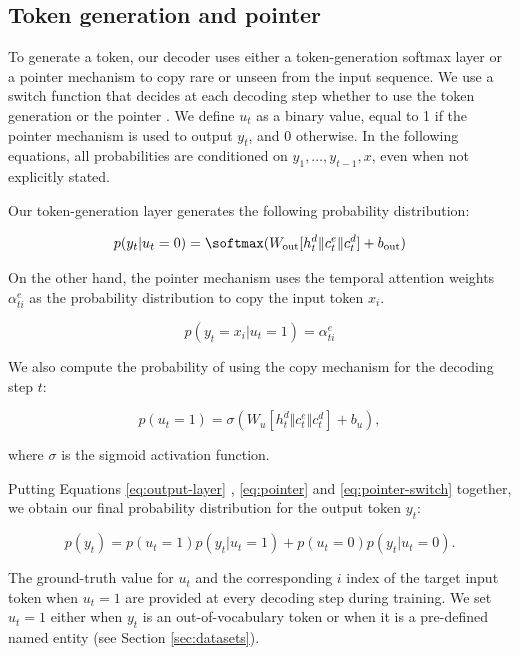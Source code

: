 \subsection{Token generation and pointer}
\label{ssec:output-layer}

To generate a token, our decoder uses either a token-generation softmax layer or a pointer mechanism to copy rare or unseen from the input sequence. We use a switch function that decides at each decoding step whether to use the token generation or the pointer \citep{gulcehre2016,nallapati2016}. We define $u_t$ as a binary value, equal to 1 if the pointer mechanism is used to output $y_t$, and 0 otherwise. In the following equations, all probabilities are conditioned on $y_1, \ldots, y_{t-1}, x$, even when not explicitly stated.

Our token-generation layer generates the following probability distribution:

\begin{equation}
p(y_t | u_t = 0) = \softmax(W_\textrm{out} [h^{d}_t \Vert c^e_t \Vert c^d_t] + b_\textrm{out})
\label{eq:output-layer}
\end{equation}

On the other hand, the pointer mechanism uses the temporal attention weights $\alpha^e_{ti}$ as the probability distribution to copy the input token $x_i$.

\begin{equation}
p(y_t = x_i |  u_t = 1 ) = \alpha^e_{ti}
\label{eq:pointer}
\end{equation}

We also compute the probability of using the copy mechanism for the decoding step $t$:

\begin{equation}
p(u_t = 1) = \sigma(W_{u} [h^{d}_t \Vert c^e_t \Vert c^d_t] + b_u),
\label{eq:pointer-switch}
\end{equation}

where $\sigma$ is the sigmoid activation function.

Putting Equations \ref{eq:output-layer} , \ref{eq:pointer} and \ref{eq:pointer-switch} together, we obtain our final probability distribution for the output token $y_t$:

\begin{equation}
p(y_t) = p(u_t = 1) p(y_t | u_t = 1) + p(u_t = 0) p(y_t | u_t = 0).
\label{eq:pointer-switch-softmax}
\end{equation}

The ground-truth value for $u_t$ and the corresponding $i$ index of the target input token when $u_t = 1$ are provided at every decoding step during training. We set $u_t = 1$ either when $y_t$ is an out-of-vocabulary token or when it is a pre-defined named entity (see Section \ref{sec:datasets}).

